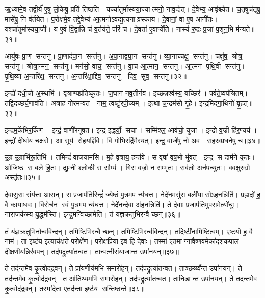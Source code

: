 ऋ॒ध्यामे॒व तद्वी॒र्य॑ ए॒षु लो॒केषु॒ प्रति॑ तिष्ठति। यच्चा॑तुर्मास्यया॒ज्यात्मनो॒ नाव॒द्येत्। दे॒वेभ्य॒ आवृ॑श्च्येत। च॒तृ॒षुच॑तृषु॒ मासे॑षु॒ नि व॑र्तयेत। प॒रोक्ष॑मे॒व तद्दे॒वेभ्य॑ आ॒त्मनोऽव॑द्य॒त्यनाव्रस्काय। दे॒वानां॒ वा ए॒ष आनी॑तः। यश्चा॑तुर्मास्यया॒जी। य ए॒वं वि॒द्वान्नि च॑ व॒र्तय॑ते॒ परि॑ च। दे॒वता॑ ए॒वाप्ये॑ति। नास्य॑ रु॒द्रः प्र॒जां प॒शून॒भि म॑न्यते॥३१॥\anuvakamend[ए॒त्ये॒त्य॒यु॒ञ्ज॒तासु॑रा एति लो॒का म॑न्यते]

आयु॑षः प्रा॒ण सन्त॑नु। प्रा॒णाद॑पा॒न सन्त॑नु। अ॒पा॒नाद्व्या॒न सन्त॑नु। व्या॒नाच्चक्षु॒ सन्त॑नु। चक्षु॑ष॒ श्रोत्र॒ सन्त॑नु। श्रोत्रा॒न्मन॒ सन्त॑नु। मन॑सो॒ वाच॒ सन्त॑नु। वा॒च आ॒त्मान॒ सन्त॑नु। आ॒त्मन॑ पृथि॒वी सन्त॑नु। पृ॒थि॒व्या अ॒न्तरि॑क्ष॒ सन्त॑नु। अ॒न्तरि॑क्षा॒द्दिव॒ सन्त॑नु। दिव॒ सुव॒ सन्त॑नु॥३२॥\anuvakamend[अ॒न्तरि॑क्ष॒ सन्त॑नु॒ द्वे च॑]

इन्द्रो॑ दधी॒चो अ॒स्थभि॑। वृ॒त्राण्यप्र॑तिष्कुतः। ज॒घान॑ नव॒तीर्नव॑। इ॒च्छन्नश्व॑स्य॒ यच्छिर॑। पर्व॑ते॒ष्वप॑श्रितम्। तद्वि॑दच्छर्य॒णाव॑ति। अत्राह॒ गोरम॑न्वत। नाम॒ त्वष्टु॑रपी॒च्यम्। इ॒त्था च॒न्द्रम॑सो गृ॒हे। इन्द्र॒मिद्गा॒थिनो॑ बृ॒हत्॥३३॥

इन्द्र॑म॒र्केभि॑र॒र्किण॑। इन्द्रं॒ वाणी॑रनूषत। इन्द्र॒ इद्धर्यो॒ सचा। सम्मि॑श्ल॒ आव॑चो॒ युजा। इन्द्रो॑ व॒ज्री हि॑र॒ण्यय॑। इन्द्रो॑ दी॒र्घाय॒ चक्ष॑से। आ सूर्य रोहयद्दि॒वि। वि गोभि॒रद्रि॑मैरयत्। इन्द्र॒ वाजे॑षु नो अव। स॒हस्र॑प्रधनेषु च॥३४॥

उ॒ग्र उ॒ग्राभि॑रू॒तिभि॑। तमिन्द्रं॑ वाजयामसि। म॒हे वृ॒त्राय॒ हन्त॑वे। स वृषा॑ वृष॒भो भु॑वत्। इन्द्र॒ स दाम॑ने कृ॒तः। ओजि॑ष्ठ॒ स बले॑ हि॒तः। द्यु॒म्नी श्लो॒की स सौ॒म्य॑। गि॒रा वज्रो॒ न सम्भृ॑तः। सब॑लो॒ अन॑पच्युतः। व॒व॒क्षुरु॒ग्रो अस्तृ॑तः॥३५॥\anuvakamend[बृ॒हच्चास्तृ॑तः]

दे॒वा॒सु॒राः सं॒य॑त्ता आसन्। स प्र॒जाप॑ति॒रिन्द्रं॑ ज्ये॒ष्ठं पु॒त्रमप॒ न्य॑धत्त। नेदे॑न॒मसु॑रा॒ बली॑यासोऽहन॒न्निति॑। प्र॒ह्रादो॑ ह॒ वै का॑याध॒वः। वि॒रोच॑न॒ स्वं पु॒त्रमप॒ न्य॑धत्त। नेदे॑नन्दे॒वा अ॑हन॒न्निति॑। ते दे॒वाः प्र॒जाप॑तिमुपस॒मेत्यो॑चुः। नारा॒जक॑स्य यु॒द्धम॑स्ति। इन्द्र॒मन्वि॑च्छा॒मेति॑। तं॒ य॑ज्ञक्र॒तुभि॒रन्वैच्छन्॥३६॥

तं॒ य॑ज्ञक्र॒तुभि॒र्नान्व॑विन्दन्। तमिष्टि॑भि॒रन्वैच्छन्। तमिष्टि॑भि॒रन्व॑विन्दन्। तदिष्टी॑नामिष्टि॒त्वम्। एष्ट॑यो ह॒ वै नाम॑। ता इष्ट॑य॒ इत्याच॑क्षते प॒रोक्षे॑ण। प॒रोक्ष॑प्रिया इव॒ हि दे॒वाः। तस्मा॑ ए॒तमाग्नावैष्ण॒वमेका॑दशकपालं दीक्ष॒णीय॒न्निर॑वपन्। तद॑प॒द्रुत्या॑तन्वत। तान्प॑त्नीसंया॒जान्त॒ उपा॑नयन्॥३७॥

ते तद॑न्तमे॒व कृ॒त्वोद॑द्रवन्। ते प्रा॑य॒णीय॑म॒भि स॒मारो॑हन्। तद॑प॒द्रुत्या॑तन्वत। ताञ्छ॒य्य्वँ॑न्त॒ उपा॑नयन्। ते तद॑न्तमे॒व कृ॒त्वोद॑द्रवन्। त आ॑ति॒थ्यम॒भि स॒मारो॑हन्। तद॑प॒द्रुत्या॑तन्वत। तानिडान्त॒ उपा॑नयन्। ते तद॑न्तमे॒व कृ॒त्वोद॑द्रवन्। तस्मा॑दे॒ता ए॒तद॑न्ता॒ इष्ट॑य॒ सन्ति॑ष्ठन्ते॥३८॥

